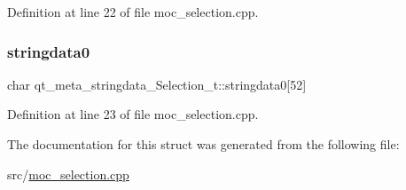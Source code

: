 Definition at line 22 of file moc\+\_\+selection.\+cpp.

\mbox{\label{structqt__meta__stringdata___selection__t_ad1deaf48ab445e4da2aa3ad2b77d845f}} 
\subsubsection{\texorpdfstring{stringdata0}{stringdata0}}
{\footnotesize\ttfamily char qt\+\_\+meta\+\_\+stringdata\+\_\+\+Selection\+\_\+t\+::stringdata0\mbox{[}52\mbox{]}}



Definition at line 23 of file moc\+\_\+selection.\+cpp.



The documentation for this struct was generated from the following file\+:\begin{DoxyCompactItemize}
\item 
src/\mbox{\hyperlink{moc__selection_8cpp}{moc\+\_\+selection.\+cpp}}\end{DoxyCompactItemize}
